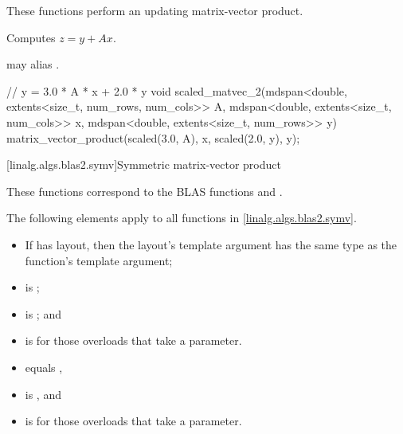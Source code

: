 \begin{itemdescr}
\pnum
These functions perform an updating matrix-vector product.

\pnum
\effects
Computes $z = y + A x$.

\pnum
\remarks
{} may alias .
\end{itemdescr}

\begin{example}
\begin{codeblock}
// y = 3.0 * A * x + 2.0 * y
void scaled_matvec_2(mdspan<double, extents<size_t, num_rows, num_cols>> A,
  mdspan<double, extents<size_t, num_cols>> x, mdspan<double, extents<size_t, num_rows>> y) {
  matrix_vector_product(scaled(3.0, A), x, scaled(2.0, y), y);
}
\end{codeblock}
\end{example}

[linalg.algs.blas2.symv]{Symmetric matrix-vector product}

\pnum
\begin{note}
These functions correspond to the BLAS functions
 and \supercite{blas2}.
\end{note}

\pnum
The following elements apply to all functions in \ref{linalg.algs.blas2.symv}.

\pnum
\mandates
\begin{itemize}
\item
If  has  layout,
then the layout's  template argument has
the same type as the function's  template argument;
\item
{} is ;
\item
{}
is ; and
\item
{}
is  for those overloads that take a  parameter.
\end{itemize}

\pnum
\expects
\begin{itemize}
\item
{} equals ,
\item
{} is , and
\item
{} is 
for those overloads that take a  parameter.
\end{itemize}

